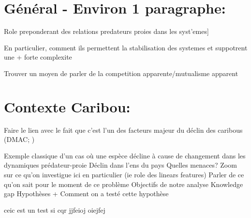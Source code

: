 
\section{Général - Environ 1 paragraphe:}
Role preponderant des relations predateurs proies dans les syst'emes]

En particulier, comment ils permettent la stabilisation des systemes et suppotrent une + forte complexite

Trouver un moyen de parler de la competition apparente/mutualisme apparent


\section{Contexte Caribou:}

Faire le lien avec le fait que c'est l'un des facteurs majeur du déclin des caribous (DMAC; )

Exemple classique d'un cas où une espèce décline à cause de changement dans les dynamiques prédateur-proie
Déclin dans l'ens du pays
Quelles menaces?
Zoom sur ce qu'on investigue ici en particulier (ie role des linears features)
Parler de ce qu'on sait pour le moment de ce problème
Objectifs de notre analyse
Knowledge gap
Hypothèses + Comment on a testé cette hypothèse

ceic est un test si cqr jjfeioj oiejfej